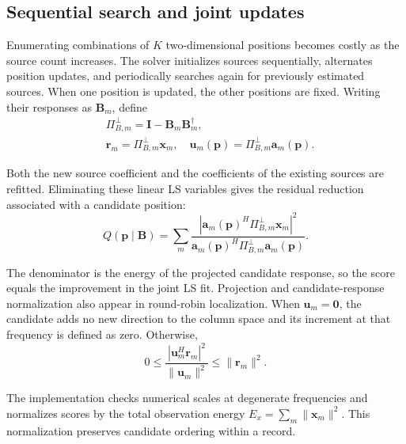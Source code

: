 \documentclass[11pt,a4paper]{article}
\numberwithin{equation}{section}
\numberwithin{figure}{section}
\numberwithin{table}{section}
\begin{document}
\subsection{Sequential search and joint updates}\label{sec:2.4}

Enumerating combinations of $K$ two-dimensional positions becomes costly as the source count increases. The solver initializes sources sequentially, alternates position updates, and periodically searches again for previously estimated sources. When one position is updated, the other positions are fixed. Writing their responses as $\mathbf{B}_m$, define
\begin{equation}\label{eq:2.11}
\begin{aligned}
&\Pi_{B,m}^\perp =\mathbf{I}-\mathbf{B}_m\mathbf{B}_m^\dagger, \\
& \mathbf{r}_m=\Pi_{B,m}^\perp\mathbf{x}_m, \quad \mathbf{u}_m(\mathbf{p})=\Pi_{B,m}^\perp\mathbf{a}_m(\mathbf{p}).
\end{aligned}
\end{equation}

Both the new source coefficient and the coefficients of the existing sources are refitted. Eliminating these linear LS variables gives the residual reduction associated with a candidate position:
\begin{equation}\label{eq:2.12}
Q(\mathbf{p}\mid\mathbf{B}) = \sum_m \frac{|\mathbf{a}_m(\mathbf{p})^H\Pi_{B,m}^\perp\mathbf{x}_m|^2} {\mathbf{a}_m(\mathbf{p})^H\Pi_{B,m}^\perp\mathbf{a}_m(\mathbf{p})}.
\end{equation}

The denominator is the energy of the projected candidate response, so the score equals the improvement in the joint LS fit. Projection and candidate-response normalization also appear in round-robin localization\cite{ref07}. When $\mathbf{u}_m=\mathbf{0}$, the candidate adds no new direction to the column space and its increment at that frequency is defined as zero. Otherwise,
\begin{equation}\label{eq:2.13}
0\leq \frac{|\mathbf{u}_m^H\mathbf{r}_m|^2}{\|\mathbf{u}_m\|^2} \leq\|\mathbf{r}_m\|^2.
\end{equation}

The implementation checks numerical scales at degenerate frequencies and normalizes scores by the total observation energy $E_x=\sum_m\|\mathbf{x}_m\|^2$. This normalization preserves candidate ordering within a record.
\end{document}
